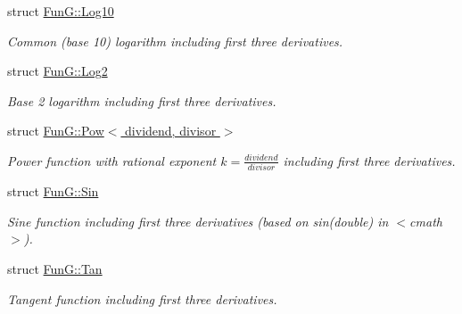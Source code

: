 \begin{DoxyCompactItemize}
struct \hyperlink{structFunG_1_1Log10}{Fun\-G\-::\-Log10}
\begin{DoxyCompactList}\small\item\em Common (base 10) logarithm including first three derivatives. \end{DoxyCompactList}\item 
struct \hyperlink{structFunG_1_1Log2}{Fun\-G\-::\-Log2}
\begin{DoxyCompactList}\small\item\em Base 2 logarithm including first three derivatives. \end{DoxyCompactList}\item 
struct \hyperlink{structFunG_1_1Pow}{Fun\-G\-::\-Pow$<$ dividend, divisor $>$}
\begin{DoxyCompactList}\small\item\em Power function with rational exponent $ k = \frac{dividend}{divisor} $ including first three derivatives. \end{DoxyCompactList}\item 
struct \hyperlink{structFunG_1_1Sin}{Fun\-G\-::\-Sin}
\begin{DoxyCompactList}\small\item\em Sine function including first three derivatives (based on sin(double) in $<$cmath$>$). \end{DoxyCompactList}\item 
struct \hyperlink{structFunG_1_1Tan}{Fun\-G\-::\-Tan}
\begin{DoxyCompactList}\small\item\em Tangent function including first three derivatives. \end{DoxyCompactList}\end{DoxyCompactItemize}

